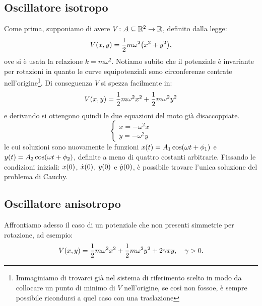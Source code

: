     \subsection{Oscillatore isotropo}
        Come prima, supponiamo di avere $V\colon A\subseteq{\mathbb{R}^2}\rightarrow\mathbb{R}$, definito dalla legge:
            $$V\qty(x,y)=\frac{1}{2}m\omega^2\qty(x^2+y^2),$$
        ove si \`e usata la relazione $k=m\omega^2$. Notiamo subito che il potenziale \`e invariante per rotazioni in quanto le curve equipotenziali sono circonferenze centrate nell'origine\footnote{Immaginiamo di trovarci gi\`a nel sistema di riferimento scelto in modo da collocare un punto di minimo di $V$ nell'origine, se cos\`i non fossoe, \`e sempre possibile ricondursi a quel caso con una traslazione}. Di conseguenza $V$ si spezza facilmente in:
            $$V\qty(x,y)=\frac{1}{2}m\omega^2x^2+\frac{1}{2}m\omega^2y^2$$
        e derivando si ottengono quindi le due equazioni del moto gi\`a disaccoppiate.
        \begin{equation*}
        \begin{cases}
            \ddot{x}=-\omega^2x\\
            \ddot{y}=-\omega^2y
        \end{cases}
        \end{equation*}
        le cui soluzioni sono nuovamente le funzioni $x\qty(t)=A_1\cos(\omega t+\phi_1)$ e $y\qty(t)=A_2\cos(\omega t+\phi_2)$, definite a meno di quattro costanti arbitrarie. Fissando le condizioni iniziali: $x\qty(0)$, $\dot{x}\qty(0)$, $y\qty(0)$ e $\dot{y}\qty(0)$, \`e possibile trovare l'unica soluzione del problema di Cauchy.
    \subsection{Oscillatore anisotropo}
        Affrontiamo adesso il caso di un potenziale che non presenti simmetrie per rotazione, ad esempio:
            $$V\qty(x,y)=\frac{1}{2}m\omega^2x^2+\frac{1}{2}m\omega^2y^2+2\gamma xy,\quad\gamma>0.$$
